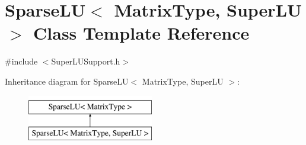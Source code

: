 \hypertarget{class_sparse_l_u_3_01_matrix_type_00_01_super_l_u_01_4}{\section{Sparse\-L\-U$<$ Matrix\-Type, Super\-L\-U $>$ Class Template Reference}
\label{class_sparse_l_u_3_01_matrix_type_00_01_super_l_u_01_4}
}


{\ttfamily \#include $<$Super\-L\-U\-Support.\-h$>$}

Inheritance diagram for Sparse\-L\-U$<$ Matrix\-Type, Super\-L\-U $>$\-:\begin{figure}[H]
\begin{center}
\leavevmode
\includegraphics[height=2.000000cm]{class_sparse_l_u_3_01_matrix_type_00_01_super_l_u_01_4}
\end{center}
\end{figure}
